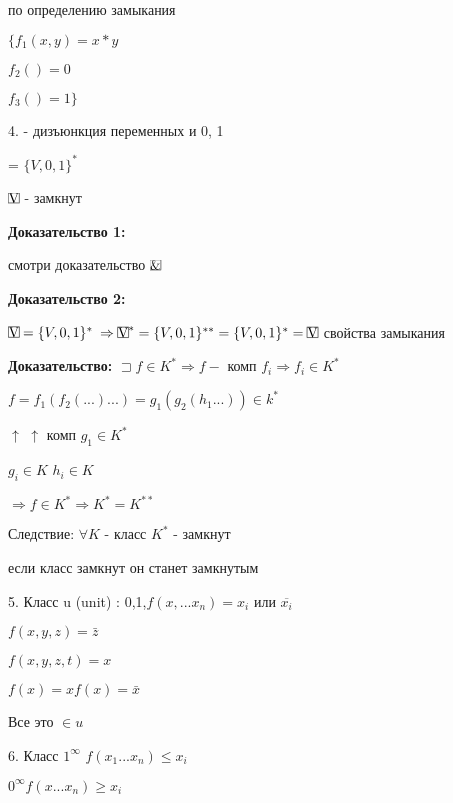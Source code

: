 \documentclass[russian]{lecture-notes}
\begin{document}
\begin{example}
\begin{proposition}
            по определению замыкания

            $\{f_{1}(x,y) = x*y$

            $f_{2}() = 0$

            $f_{3}() = 1\}$

        \end{proposition}

        4.  - дизъюнкция переменных и 0, 1

         = $\{V,0,1\}^{*}$

        \begin{proposition}

            $\frame{V} $ - замкнут

        \end{proposition}

        \textbf{Доказательство 1: }

        смотри доказательство $\frame{\&}$


        \textbf{Доказательство 2: }

        $\frame{V} = \{V,0,1\}^{*}$
        $\Rightarrow \frame{V}^{*} = \{V,0,1\}^{**} = \{V,0,1\}^{*} = \frame{V}$ свойства замыкания

    \end{example}

    \textbf{Доказательство: } $\sqsupset  f \in K^{*} \Rightarrow f - $ комп $f_{i}
    \Rightarrow f_{i} \in K^{*}
    $

    $ f = f_{1} (f_2(...)...) = g_{1}(g_{2}(h_{1}...)) \in k^{*}
    $

    \qquad $\uparrow$ \quad $\uparrow$ \qquad комп $g_{1} \in K^{*}$

    $g_{i} \in K $ $h_{i} \in K$

    $\Rightarrow f \in K^{*} \Rightarrow K^{*} = K^{**}$

    Следствие: $\forall K$ - класс $K^{*}$ - замкнут

    если класс замкнут он станет замкнутым

    5. Класс u (unit) : 0,1,$f(x,...x_{n}) = x_{i}$ или  $\overline{x_{i}}$

    $f(x,y,z) = \bar{z}$

    $f(x,y,z,t) = x$

    $f(x) = x f(x) = \bar{x}$

    Все это $\in u$

    6. Класс $1^{\infty}$ $f(x_{1}...x_{n}) \leqslant x_{i} $

    \qquad $0^{\infty} f(x...x_{n}) \geqslant x_{i}$
\end{document}
